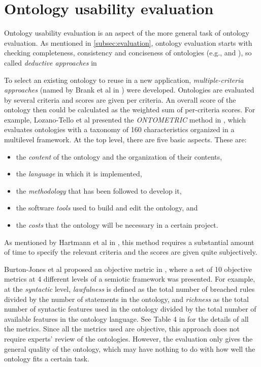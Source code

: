 \section{Ontology usability evaluation}
Ontology usability evaluation is an aspect of the more general task of ontology evaluation. As mentioned in \ref{subsec:evaluation}, ontology evaluation starts with checking completeness, consistency and conciseness of ontologies (e.g., \cite{gruninger1995methodology} and \cite{gomez2001evaluation}), so called \emph{deductive approaches} in 

To select an existing ontology to reuse in a new application, \emph{multiple-criteria approaches} (named by Brank et al in \cite{brank2005survey}) were developed. Ontologies are evaluated by several criteria and scores are given per criteria. An overall score of the ontology then could be calculated as the weighted sum of per-criteria scores. For example, Lozano-Tello et al presented the \emph{ONTOMETRIC} method in \cite{lozano2003selection,lozano2004ontometric}, which evaluates ontologies with a taxonomy of
160 characteristics organized in a multilevel framework. At the top level, there are five basic aspects. These are: 
\begin{itemize}
	\item the \emph{content} of the ontology and the
	organization of their contents,
	\item the \emph{language}
	in which it is implemented, 
	\item the \emph{methodology}
	that has been followed to develop it,
	\item the software \emph{tools} used to build and edit
	the ontology, and 
	\item the \emph{costs} that the ontology
	will be necessary in a certain project.
\end{itemize} 
As mentioned by Hartmann et al in \cite{hartmann2005d1}, this method requires a substantial amount of time to specify the relevant criteria and the scores are given quite subjectively.

Burton-Jones et al proposed an objective metric in \cite{burton2005semiotic}, where a set of 10 objective metrics at 4 different levels of a semiotic framework was presented. For example, at the \emph{syntactic} level, \emph{lawfulness} is defined as the total number of breached rules divided by the number of statements in the ontology, and \emph{richness} as the total number of syntactic features used in the ontology divided by the total number of available features in the ontology language. See Table 4 in \cite{burton2005semiotic} for the details of all the metrics. Since all the metrics used are objective, this approach does not require experts' review of the ontologies. However, the evaluation only gives the general quality of the ontology, which may have nothing to do with how well the ontology fits a certain task.

